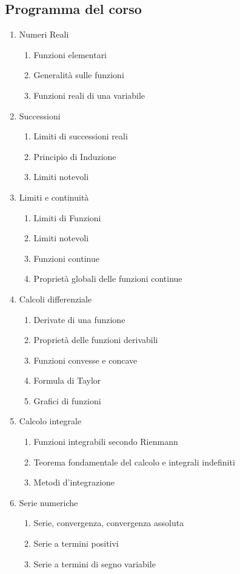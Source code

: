 \documentclass[12pt, a4paper, openany]{book}
\begin{document}
\subsection*{Programma del corso}
\begin{enumerate}
\item Numeri Reali
\begin{enumerate}
\item Funzioni elementari
\item Generalità sulle funzioni
\item Funzioni reali di una variabile
\end{enumerate}
\item Successioni
\begin{enumerate}
    \item Limiti di successioni reali
    \item Principio di Induzione
    \item Limiti notevoli
\end{enumerate}
\item Limiti e continuità
\begin{enumerate}
    \item Limiti di Funzioni
    \item Limiti notevoli
    \item Funzioni continue
    \item Proprietà globali delle funzioni continue
\end{enumerate}
\item Calcoli differenziale
\begin{enumerate}
    \item Derivate di una funzione
    \item Proprietà delle funzioni derivabili
    \item Funzioni convesse e concave
    \item Formula di Taylor
    \item Grafici di funzioni
\end{enumerate}
\item Calcolo integrale
\begin{enumerate}
    \item Funzioni integrabili secondo Rienmann
    \item Teorema fondamentale del calcolo e integrali indefiniti
    \item Metodi d'integrazione
\end{enumerate}
\item Serie numeriche
\begin{enumerate}
    \item Serie, convergenza, convergenza assoluta
    \item Serie a termini positivi
    \item Serie a termini di segno variabile
\end{enumerate}
\end{enumerate}
\end{document}
